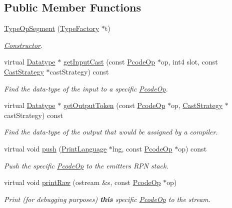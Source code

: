 \subsection*{Public Member Functions}
\begin{DoxyCompactItemize}
\item 
\mbox{\hyperlink{class_type_op_segment_a91d95ddefbd20fbc9b8ae2cb26aa4139}{Type\+Op\+Segment}} (\mbox{\hyperlink{class_type_factory}{Type\+Factory}} $\ast$t)
\begin{DoxyCompactList}\small\item\em \mbox{\hyperlink{class_constructor}{Constructor}}. \end{DoxyCompactList}\item 
virtual \mbox{\hyperlink{class_datatype}{Datatype}} $\ast$ \mbox{\hyperlink{class_type_op_segment_abc93e6a0769d61082a6d44577ac9abf6}{get\+Input\+Cast}} (const \mbox{\hyperlink{class_pcode_op}{Pcode\+Op}} $\ast$op, int4 slot, const \mbox{\hyperlink{class_cast_strategy}{Cast\+Strategy}} $\ast$cast\+Strategy) const
\begin{DoxyCompactList}\small\item\em Find the data-\/type of the input to a specific \mbox{\hyperlink{class_pcode_op}{Pcode\+Op}}. \end{DoxyCompactList}\item 
virtual \mbox{\hyperlink{class_datatype}{Datatype}} $\ast$ \mbox{\hyperlink{class_type_op_segment_a266bcb14bb682b5ebc298e06f7a9c12e}{get\+Output\+Token}} (const \mbox{\hyperlink{class_pcode_op}{Pcode\+Op}} $\ast$op, \mbox{\hyperlink{class_cast_strategy}{Cast\+Strategy}} $\ast$cast\+Strategy) const
\begin{DoxyCompactList}\small\item\em Find the data-\/type of the output that would be assigned by a compiler. \end{DoxyCompactList}\item 
virtual void \mbox{\hyperlink{class_type_op_segment_a2379c6e24cf03a2cef6c297a5d9f4c92}{push}} (\mbox{\hyperlink{class_print_language}{Print\+Language}} $\ast$lng, const \mbox{\hyperlink{class_pcode_op}{Pcode\+Op}} $\ast$op) const
\begin{DoxyCompactList}\small\item\em Push the specific \mbox{\hyperlink{class_pcode_op}{Pcode\+Op}} to the emitter\textquotesingle{}s R\+PN stack. \end{DoxyCompactList}\item 
virtual void \mbox{\hyperlink{class_type_op_segment_aa0faf7a0a8f5094b7b851bcefca5051f}{print\+Raw}} (ostream \&s, const \mbox{\hyperlink{class_pcode_op}{Pcode\+Op}} $\ast$op)
\begin{DoxyCompactList}\small\item\em Print (for debugging purposes) {\bfseries{this}} specific \mbox{\hyperlink{class_pcode_op}{Pcode\+Op}} to the stream. \end{DoxyCompactList}\end{DoxyCompactItemize}

